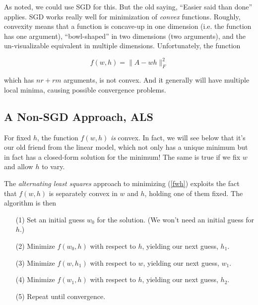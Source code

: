As noted, we could use SGD for this.  But the old saying, ``Easier said
than done'' applies.  SGD works really well for minimization of
\textit{convex} functions.  Roughly, convexity means that a function
is concave-up in one dimension (i.e. the function has one argument),
``bowl-shaped'' in two dimensions (two arguments), and the
un-visualizable equivalent in multiple dimensions.  Unfortunately, 
the function

\begin{equation}
\label{fwh}
f(w,h) = \|A - wh\|_F^2
\end{equation}

which has $nr + rm$ arguments, is not convex.  And it generally will have
multiple local minima, causing possible convergence problems.

\subsection{A Non-SGD Approach, ALS}

For fixed $h$, the function $f(w,h)$ \textit{is} convex.  In fact, we
will see below that it's our old friend from the linear model, which not
only has a unique minimum but in fact has a closed-form solution for the
minimum!  The same is true if we fix $w$ and allow $h$ to vary.

The \textit{alternating least squares} approach to minimizing (\ref{fwh})
exploits the fact that $f(w,h)$ is separately convex in $w$ and $h$,
holding one of them fixed.  The algorithm is then

\begin{itemize}

\item [(1)] Set an initial guess $w_0$ for the solution.  (We won't need
an initial guess for $h$.)

\item [(2)] Minimize $f(w_0,h)$ with respect to $h$, yielding our next
guess, $h_1$.

\item [(3)] Minimize $f(w,h_1)$ with respect to $w$, yielding our next
guess, $w_1$.

\item [(4)] Minimize $f(w_1,h)$ with respect to $h$, yielding our next
guess, $h_2$.

\item [(5)] Repeat until convergence.

\end{itemize} 

